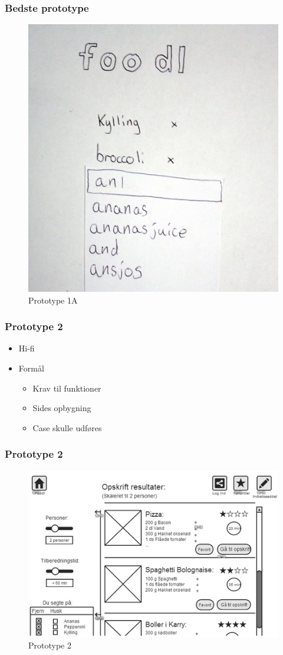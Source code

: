 \begin{frame} %
	\frametitle{Bedste prototype}
	\begin{figure}
	\centering
	\includegraphics[scale=0.08]{billeder/prototype1a.jpg}
	\caption{Prototype 1A}
	\end{figure}
\end{frame}

\begin{frame}
\frametitle{Prototype 2}
	\begin{itemize}
		\item Hi-fi
		\item Formål
		\begin{itemize}
		\item Krav til funktioner
		\item Sides opbygning
		\item Case skulle udføres
		\end{itemize}
	\end{itemize}
\end{frame}

\begin{frame}
	\frametitle{Prototype 2}
	\begin{figure}
	\centering
	\includegraphics[scale=0.6]{billeder/prototype2.png}
	\caption{Prototype 2}
	\end{figure}
\end{frame}




